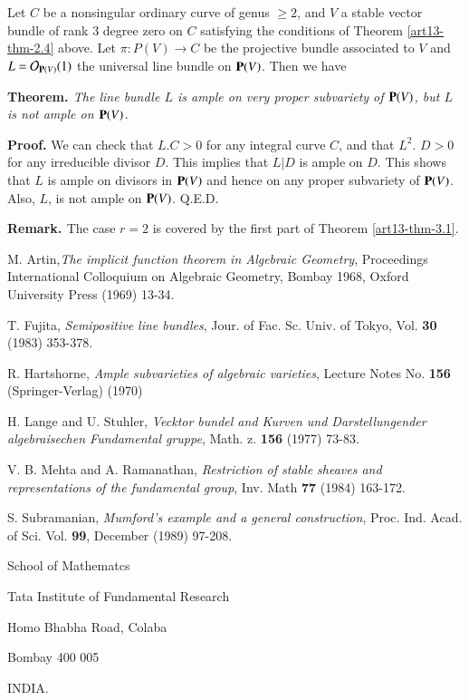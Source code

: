 \section{}\label{art13-sec-3}
Let $C$ be a nonsingular ordinary curve of genus $\geq 2$, and $V$ a stable vector bundle of rank 3 degree zero on $C$ satisfying the conditions of Theorem \eqref{art13-thm-2.4} above. Let $\pi : P(V)\rightarrow C$ be the projective bundle associated to $V$ and $L=\mathcal{O}_{\mathbf{P} (V)}(1)$ the universal line bundle on $\mathbf{P}(V)$. Then we have 

\medskip
\noindent
{\bfseries {} Theorem. \label{art13-thm-3.1}} \textit{The line bundle $L$ is ample on very proper subvariety of $\mathbf{P}(V)$, but $L$ is not ample on $\mathbf{P}(V)$.}

\medskip
\noindent
{\bfseries Proof.} We can check that $L.C > 0$ for any integral curve $C$, and that $L^{2}$. $D >0$ for any irreducible divisor $D$. This implies that $L | D$ is ample on $D$. This shows that $L$ is ample on divisors in $\mathbf{P}(V)$ and hence on any proper subvariety of $\mathbf{P}(V)$. Also, $L$, is not ample on $\mathbf{P}(V)$. \hfill Q.E.D. 

\medskip
\noindent
{\bfseries {} Remark. \label{art13-thm-3.2}} The case $r=2$ is covered by the first part of Theorem
\eqref{art13-thm-3.1}.

\begin{thebibliography}{99}
 M. Artin,\textit{The implicit function theorem in  Algebraic Geometry}, Proceedings International Colloquium on Algebraic Geometry, Bombay 1968, Oxford University Press (1969) 13-34.

 T. Fujita, \textit{Semipositive line bundles}, Jour. of Fac. Sc. Univ. of Tokyo, Vol. {\bf 30} (1983) 353-378.

 R. Hartshorne, \textit{Ample subvarieties of algebraic varieties}, Lecture Notes No. {\bf 156} (Springer-Verlag) (1970)

 H. Lange and U. Stuhler, \textit{Vecktor bundel and Kurven und Darstellungender algebraisechen Fundamental gruppe}, Math. z. {\bf 156} (1977) 73-83.

 V. B. Mehta and A. Ramanathan, \textit{Restriction of stable sheaves and representations of the fundamental group}, Inv. Math {\bf 77} (1984) 163-172.

 S. Subramanian, \textit{Mumford's example and a general construction}, Proc. Ind. Acad. of Sci. Vol. {\bf 99}, December (1989) 97-208.
\end{thebibliography}

\begin{flushleft}
School of Mathematcs

Tata Institute of Fundamental Research

Homo Bhabha Road, Colaba

Bombay 400 005

INDIA.
\end{flushleft}
